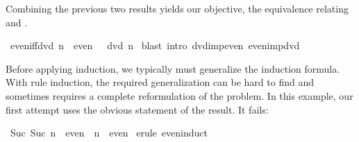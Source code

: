 \begin{isabellebody}
\endisatagproof
{\isafoldproof}%
%
\isadelimproof
%
\endisadelimproof
%
\begin{isamarkuptext}%
Combining the previous two results yields our objective, the
equivalence relating  and . 
%
\end{isamarkuptext}%
\isamarkuptrue%
\isamarkupfalse%
\ even{}iff{}dvd{}\ {}{}n\ {}\ even{}\ {}\ {}{}\ dvd\ n{}{}\isanewline
%
\isadelimproof
%
\endisadelimproof
%
\isatagproof
{}\isamarkupfalse%
\ {}blast\ intro{}\ dvd{}imp{}even\ even{}imp{}dvd{}%
\endisatagproof
{\isafoldproof}%
%
\isadelimproof
%
\endisadelimproof
%
\isamarkuptrue%
%
\begin{isamarkuptext}%
%
Before applying induction, we typically must generalize
the induction formula.  With rule induction, the required generalization
can be hard to find and sometimes requires a complete reformulation of the
problem.  In this  example, our first attempt uses the obvious statement of
the result.  It fails:%
\end{isamarkuptext}%
\isamarkuptrue%
\isamarkupfalse%
\ {}Suc\ {}Suc\ n{}\ {}\ even\ {}\ n\ {}\ even{}\isanewline
%
\isadelimproof
%
\endisadelimproof
%
\isatagproof
{}\isamarkupfalse%
\ {}erule\ even{}induct{}\isanewline
{}\isamarkupfalse%
%
\endisatagproof
{\isafoldproof}%
%
\isadelimproof
%
\endisadelimproof

\end{isabellebody}
